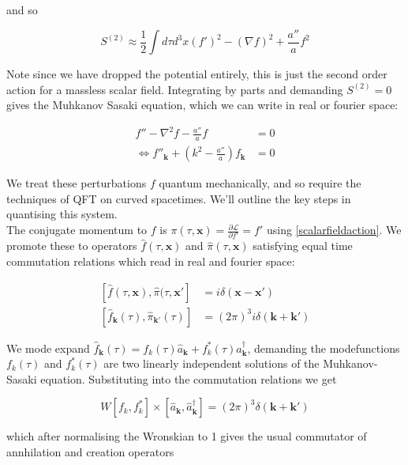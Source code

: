 \documentclass[a4paper,10pt]{article}
\renewcommand{\v}[1]{\mathbf{#1}}
\newcommand{\half}{\frac{1}{2}}
\newcommand{\ann}[1]{\hat{a}_{\v{#1}}}
\newcommand{\cre}[1]{\hat{a}^\dagger_{\v{#1}}}
\begin{document}
and so 

\begin{equation}
S^{(2)} \approx \half \int d\tau d^3x (f')^2 - (\nabla f)^2 + \frac{a''}{a}f^2
\end{equation}

Note since we have dropped the potential entirely, this is just the second order action for a massless scalar field. Integrating by parts and demanding $S^{(2)}=0$ gives the Muhkanov Sasaki equation, which we can write in real or fourier space:

\begin{equation}\begin{split}
f''-\nabla^2f-\frac{a''}{a}f &= 0 \\
\Leftrightarrow f''_{\v{k}} + (k^2-\frac{a''}{a})f_{\v{k}} &= 0
\label{MS}
\end{split}\end{equation}

We treat these perturbations $f$ quantum mechanically, and so require the techniques of QFT on curved spacetimes. We'll outline the key steps in quantising this system.\\

The conjugate momentum to $f$ is $\pi(\tau, \v{x}) =  \frac{\partial \mathcal{L}}{\partial f'} = f'$ using \ref{scalarfieldaction}. We promote these to operators $\hat{f}(\tau, \v{x})$ and $\hat{\pi}(\tau, \v{x})$ satisfying equal time commutation relations which read in real and fourier space:

\begin{equation}\begin{split}
[\hat{f}(\tau, \v{x}), \hat{\pi}(\tau, \v{x'}] &= i\delta(\v{x}-\v{x'}) \\
[\hat{f}_{\v{k}}(\tau), \hat{\pi}_{\v{k'}}(\tau)] &= (2\pi)^3i\delta(\v{k}+\v{k'})
\end{split}\end{equation}

We mode expand $\hat{f}_{\v{k}}(\tau) = f_k(\tau)\ann{k}+f_k^*(\tau)\cre{k}$, demanding the modefunctions $f_k(\tau)$ and $f_k^*(\tau)$ are two linearly independent solutions of the Muhkanov-Sasaki equation. Substituting into the commutation relations we get 

\begin{equation}
W[f_k,f_k^*]\times[\ann{k}, \cre{k}] = (2\pi)^3\delta(\v{k}+\v{k'})
\end{equation}

which after normalising the Wronskian to 1 gives the usual commutator of annhilation and creation operators
\end{document}
